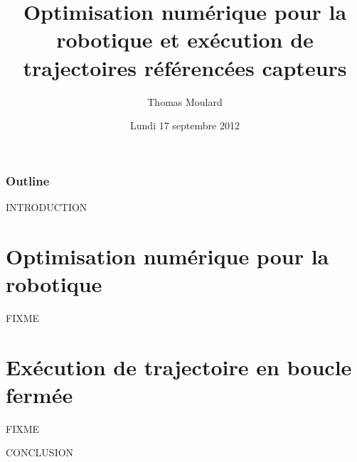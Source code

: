 \documentclass[utf8x]{beamer}
\title{Optimisation numérique pour la robotique et exécution de trajectoires référencées capteurs}
\author{Thomas Moulard}
\date{Lundi 17 septembre 2012}
\begin{document}
\begin{frame}
  \titlepage
\end{frame}

\begin{frame}
  \frametitle{Outline}
  \tableofcontents
\end{frame}

\begin{frame}
  INTRODUCTION
\end{frame}

\section{Optimisation numérique pour la robotique}

\begin{frame}
  FIXME
\end{frame}


\section{Exécution de trajectoire en boucle fermée}

\begin{frame}
  FIXME
\end{frame}


\begin{frame}
  CONCLUSION
\end{frame}
\end{document}
